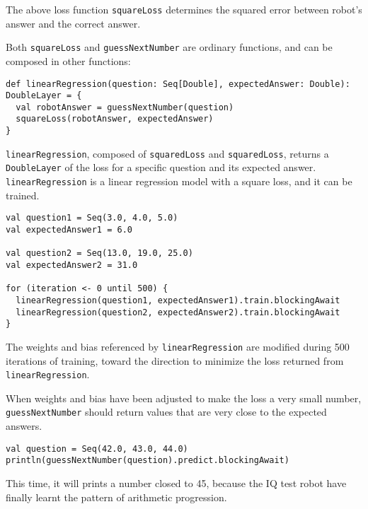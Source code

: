 The above loss function \lstinline{squareLoss} determines the squared error between robot's answer and the correct answer.

Both \lstinline{squareLoss} and \lstinline{guessNextNumber} are ordinary functions, and can be composed in other functions:

\begin{lstlisting}[float={h t b p},caption={A differentiable function to train a linear regression model}]
def linearRegression(question: Seq[Double], expectedAnswer: Double): DoubleLayer = {
  val robotAnswer = guessNextNumber(question)
  squareLoss(robotAnswer, expectedAnswer)
}
\end{lstlisting}

\lstinline{linearRegression}, composed of \lstinline{squaredLoss} and \lstinline{squaredLoss}, returns a \lstinline{DoubleLayer} of the loss for a specific question and its expected answer. \lstinline{linearRegression} is a linear regression model with a square loss, and it can be trained.

\begin{lstlisting}[float={h t b p},caption={Training for 500 iterations}]
val question1 = Seq(3.0, 4.0, 5.0)
val expectedAnswer1 = 6.0

val question2 = Seq(13.0, 19.0, 25.0)
val expectedAnswer2 = 31.0

for (iteration <- 0 until 500) {
  linearRegression(question1, expectedAnswer1).train.blockingAwait
  linearRegression(question2, expectedAnswer2).train.blockingAwait
}
\end{lstlisting}

The weights and bias referenced by \lstinline{linearRegression} are modified during 500 iterations of training, toward the direction to minimize the loss returned from \lstinline{linearRegression}.

When weights and bias have been adjusted to make the loss a very small number, \lstinline{guessNextNumber} should return values that are very close to the expected answers.

\begin{lstlisting}[float={h t b p},caption={Inference on a trained model},label={predict_trained}]
val question = Seq(42.0, 43.0, 44.0)
println(guessNextNumber(question).predict.blockingAwait)
\end{lstlisting}

This time, it will prints a number closed to 45, because the IQ test robot have finally learnt the pattern of arithmetic progression.

